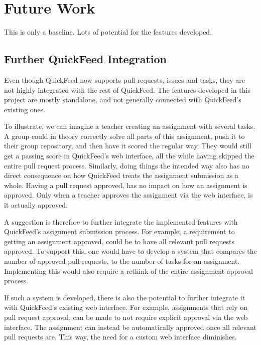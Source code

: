 
\chapter{Future Work}
\label{ch:future-work}

This is only a baseline.
Lots of potential for the features developed.

\section{Further QuickFeed Integration}

Even though QuickFeed now supports pull requests, issues and tasks, they are not highly integrated with the rest of QuickFeed.
The features developed in this project are mostly standalone, and not generally connected with QuickFeed's existing ones.

To illustrate, we can imagine a teacher creating an assignment with several tasks.
A group could in theory correctly solve all parts of this assignment, push it to their group repository, and then have it scored the regular way.
They would still get a passing score in QuickFeed's web interface, all the while having skipped the entire pull request process.
Similarly, doing things the intended way also has no direct consequence on how QuickFeed treats the assignment submission as a whole.
Having a pull request approved, has no impact on how an assignment is approved.
Only when a teacher approves the assignment via the web interface, is it actually approved.

A suggestion is therefore to further integrate the implemented features with QuickFeed's assignment submission process.
For example, a requirement to getting an assignment approved, could be to have all relevant pull requests approved.
To support this, one would have to develop a system that compares the number of approved pull requests, to the number of tasks for an assignment.
Implementing this would also require a rethink of the entire assignment approval process.

If such a system is developed, there is also the potential to further integrate it with QuickFeed's existing web interface.
For example, assignments that rely on pull request approval, can be made to not require explicit approval via the web interface.
The assignment can instead be automatically approved once all relevant pull requests are.
This way, the need for a custom web interface diminishes.

